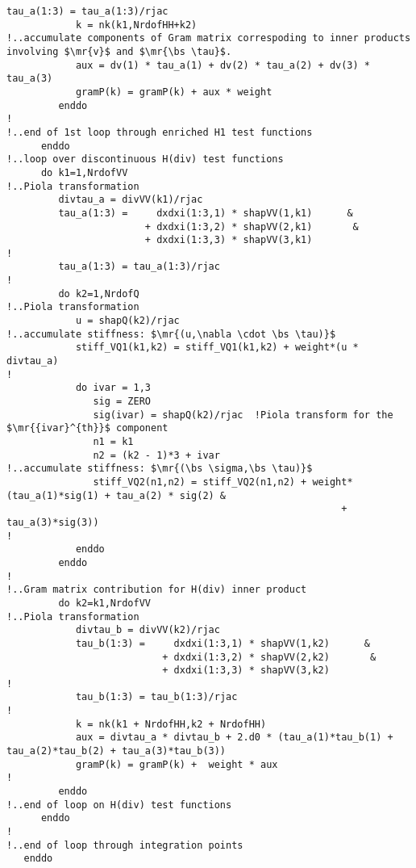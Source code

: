 \begin{lstlisting}[mathescape,caption=\file{POISSON/ULTRAWEAK\_DPG/}\routine{elem}: element integration]
            tau_a(1:3) = tau_a(1:3)/rjac
            k = nk(k1,NrdofHH+k2)
!..accumulate components of Gram matrix correspoding to inner products involving $\mr{v}$ and $\mr{\bs \tau}$. 
            aux = dv(1) * tau_a(1) + dv(2) * tau_a(2) + dv(3) * tau_a(3)
            gramP(k) = gramP(k) + aux * weight
         enddo
!
!..end of 1st loop through enriched H1 test functions
      enddo
!..loop over discontinuous H(div) test functions
      do k1=1,NrdofVV
!..Piola transformation
         divtau_a = divVV(k1)/rjac
         tau_a(1:3) =     dxdxi(1:3,1) * shapVV(1,k1)      &
                        + dxdxi(1:3,2) * shapVV(2,k1)       &
                        + dxdxi(1:3,3) * shapVV(3,k1)
!
         tau_a(1:3) = tau_a(1:3)/rjac   
!         
         do k2=1,NrdofQ
!..Piola transformation
            u = shapQ(k2)/rjac
!..accumulate stiffness: $\mr{(u,\nabla \cdot \bs \tau)}$
            stiff_VQ1(k1,k2) = stiff_VQ1(k1,k2) + weight*(u * divtau_a)
!
            do ivar = 1,3
               sig = ZERO
               sig(ivar) = shapQ(k2)/rjac  !Piola transform for the $\mr{{ivar}^{th}}$ component
               n1 = k1
               n2 = (k2 - 1)*3 + ivar
!..accumulate stiffness: $\mr{(\bs \sigma,\bs \tau)}$
               stiff_VQ2(n1,n2) = stiff_VQ2(n1,n2) + weight*(tau_a(1)*sig(1) + tau_a(2) * sig(2) &
                                                          + tau_a(3)*sig(3))
!
            enddo
         enddo
!
!..Gram matrix contribution for H(div) inner product
         do k2=k1,NrdofVV
!..Piola transformation
            divtau_b = divVV(k2)/rjac
            tau_b(1:3) =     dxdxi(1:3,1) * shapVV(1,k2)      &
                           + dxdxi(1:3,2) * shapVV(2,k2)       &
                           + dxdxi(1:3,3) * shapVV(3,k2)
!   
            tau_b(1:3) = tau_b(1:3)/rjac
!
            k = nk(k1 + NrdofHH,k2 + NrdofHH)
            aux = divtau_a * divtau_b + 2.d0 * (tau_a(1)*tau_b(1) + tau_a(2)*tau_b(2) + tau_a(3)*tau_b(3))
            gramP(k) = gramP(k) +  weight * aux
!
         enddo   
!..end of loop on H(div) test functions
      enddo
!
!..end of loop through integration points
   enddo
\end{lstlisting}


